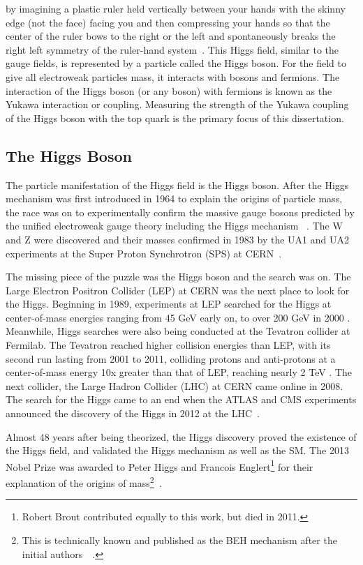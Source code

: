 by imagining a plastic ruler held vertically between your hands with the skinny edge (not the face) facing you and then compressing your hands so that the center of the ruler bows to the right or the left and
spontaneously breaks the right left symmetry of the ruler-hand system~\cite{robinson}.
This Higgs field, similar to the gauge fields, is represented by a particle called the Higgs boson.
For the field to give all electroweak particles mass, it interacts with bosons and fermions.
The interaction of the Higgs boson (or any boson) with fermions is known as the Yukawa interaction or coupling. Measuring the strength of the Yukawa coupling
of the Higgs boson with the top quark is the primary focus of this dissertation.

\subsection{The Higgs Boson}

The particle manifestation of the Higgs field is the Higgs boson. After the Higgs mechanism was first introduced in 1964 to explain the origins of particle mass,
the race was on to experimentally confirm the massive gauge bosons predicted by the unified electroweak gauge theory including the Higgs mechanism ~\cite{1964_prl_higgs}.
The W and Z were discovered and their masses confirmed in 1983 by the UA1 and UA2 experiments at the Super Proton Synchrotron (SPS) at CERN~\cite{UA1}\cite{UA2}\cite{Z}.

The missing piece of the puzzle was the Higgs boson and the search was on. The Large Electron Positron Collider (LEP) at CERN was the next place to look for the Higgs.
Beginning in 1989, experiments at LEP searched for the Higgs at center-of-mass energies ranging from 45 GeV early on, to over 200 GeV in 2000 \cite{LEPHIGGS}. Meanwhile, Higgs
searches were also being conducted at the Tevatron collider at Fermilab. The Tevatron reached higher collision energies than LEP, with its second run lasting from 2001
to 2011, colliding protons and anti-protons at a center-of-mass energy 10x greater than that of LEP, reaching nearly 2 TeV \cite{TEVHIGGS_2010}. The next collider, the Large Hadron Collider
(LHC) at CERN came online in 2008. The search for the Higgs came to an end when the ATLAS and CMS experiments announced the discovery of the Higgs in 2012 at the LHC~\cite{cms_higgs}\cite{atlas_higgs}. 

Almost 48 years after being theorized, the Higgs discovery proved the existence
of the Higgs field, and validated the Higgs mechanism as well as the SM. The 2013 Nobel Prize was awarded to
Peter Higgs and Francois Englert\footnote{Robert Brout contributed equally to this work, but died in 2011.} for their explanation of the origins of mass\footnote{This is
technically known and published as the BEH mechanism after the initial authors~\cite{1964_prl_higgs}~\cite{1964_prl_englert}.}~\cite{NP13}.

